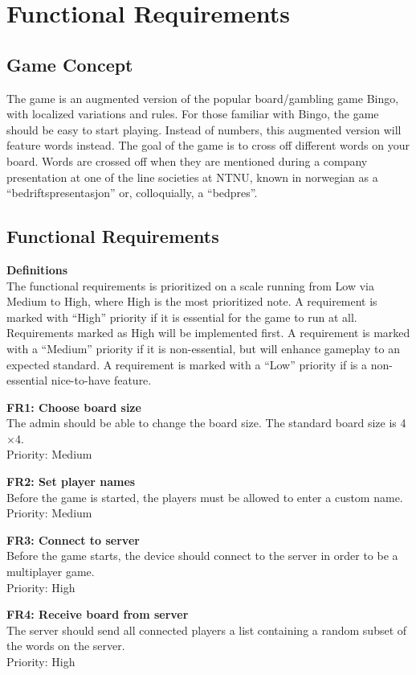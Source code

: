 \section{Functional Requirements} 
\label{sec:functional requirements}

\subsection{Game Concept}
The game is an augmented version of the popular board/gambling game Bingo,
with localized variations and rules. For those familiar with Bingo,
the game should be easy to start playing. Instead of numbers, this augmented
version will feature words instead. The goal of the game is to cross off
different words on your board. Words are crossed off when they are mentioned
during a company presentation at one of the line societies at NTNU, known in
norwegian as a ``bedriftspresentasjon'' or, colloquially, a ``bedpres''.


\subsection{Functional Requirements}
{\bf Definitions}\\
The functional requirements is prioritized on a scale running from Low via Medium to High, where High is the most prioritized note. 
A requirement is marked with ``High'' priority if it is essential for the game to run at all. Requirements marked as High will be implemented first.
A requirement is marked with a ``Medium'' priority if it is non-essential, but will enhance gameplay to an expected standard. 
A requirement is marked with a ``Low'' priority if is a non-essential nice-to-have feature.

{\bf FR1: Choose board size}\\
The admin should be able to change the board size. The standard board size is
4$\times$4.\\
Priority: Medium

{\bf FR2: Set player names}\\
Before the game is started, the players must be allowed to enter a custom
name.\\
Priority: Medium

{\bf FR3: Connect to server}\\
Before the game starts, the device should connect to the server in order to be
a multiplayer game.\\
Priority: High

{\bf FR4: Receive board from server}\\
The server should send all connected players a list containing a random
subset of the words on the server.\\
Priority: High

